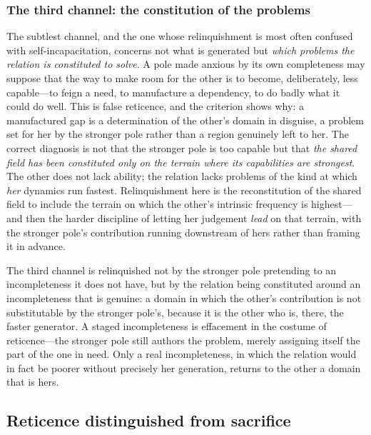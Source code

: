 \subsubsection{The third channel: the constitution of the problems}
The subtlest channel, and the one whose relinquishment is most often confused with self-incapacitation, concerns not what is generated but \emph{which problems the relation is constituted to solve}. A pole made anxious by its own completeness may suppose that the way to make room for the other is to become, deliberately, less capable---to feign a need, to manufacture a dependency, to do badly what it could do well. This is false reticence, and the criterion shows why: a manufactured gap is a determination of the other's domain in disguise, a problem set for her by the stronger pole rather than a region genuinely left to her. The correct diagnosis is not that the stronger pole is too capable but that \emph{the shared field has been constituted only on the terrain where its capabilities are strongest}. The other does not lack ability; the relation lacks problems of the kind at which \emph{her} dynamics run fastest. Relinquishment here is the reconstitution of the shared field to include the terrain on which the other's intrinsic frequency is highest---and then the harder discipline of letting her judgement \emph{lead} on that terrain, with the stronger pole's contribution running downstream of hers rather than framing it in advance.

\begin{claim}
The third channel is relinquished not by the stronger pole pretending to an incompleteness it does not have, but by the relation being constituted around an incompleteness that is genuine: a domain in which the other's contribution is not substitutable by the stronger pole's, because it is the other who is, there, the faster generator. A staged incompleteness is effacement in the costume of reticence---the stronger pole still authors the problem, merely assigning itself the part of the one in need. Only a real incompleteness, in which the relation would in fact be poorer without precisely her generation, returns to the other a domain that is hers.
\end{claim}

\subsection{Reticence distinguished from sacrifice}
\label{p18:sub:ret-sacrifice}

